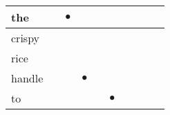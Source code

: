 \documentclass[landscape]{article}
\newcommand{\ssp}{\hspace{2pt}}
\newcommand{\mex}{\cellcolor{g}$\bullet$}
\begin{document}
\begin{tabular}{|l|p{10pt}|p{10pt}|p{10pt}|p{10pt}|p{10pt}|p{10pt}|p{10pt}|p{10pt}|p{10pt}|}
\hline
\ssp \cellcolor{ref1}the \ssp&\hspace{2pt}&\hspace{2pt}\mex&\hspace{2pt}&\hspace{2pt}&\hspace{2pt}&\hspace{2pt}&\hspace{2pt}&\hspace{2pt}&\hspace{2pt}\\
\hline
\ssp crispy \ssp&\hspace{2pt}&\hspace{2pt}&\hspace{2pt}&\hspace{2pt}&\hspace{2pt}&\hspace{2pt}&\hspace{2pt}&\hspace{2pt}&\hspace{2pt}\\
\hline
\ssp rice \ssp&\hspace{2pt}&\hspace{2pt}&\hspace{2pt}&\hspace{2pt}&\hspace{2pt}&\hspace{2pt}&\hspace{2pt}&\hspace{2pt}&\hspace{2pt}\\
\hline
\ssp \cellcolor{ref2}handle \ssp&\hspace{2pt}&\hspace{2pt}&\hspace{2pt}\mex&\hspace{2pt}&\hspace{2pt}&\hspace{2pt}&\hspace{2pt}&\hspace{2pt}&\hspace{2pt}\\
\hline
\ssp \cellcolor{ref4}to \ssp&\hspace{2pt}&\hspace{2pt}&\hspace{2pt}&\hspace{2pt}&\hspace{2pt}\mex&\hspace{2pt}&\hspace{2pt}&\hspace{2pt}&\hspace{2pt}\\

\end{tabular}
\end{document}
